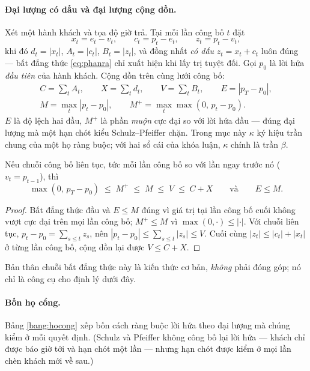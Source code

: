 \paragraph{Đại lượng có dấu và đại lượng cộng dồn.} Xét một hành khách và tọa độ giờ trả. Tại mỗi
lần công bố $t$ đặt
\begin{equation}
x_t = e_t - v_t, \qquad c_t = p_t - e_t, \qquad z_t = p_t - v_t,
\end{equation}
khi đó $d_t = |x_t|$, $A_t = |c_t|$, $B_t = |z_t|$, và đồng nhất \emph{có dấu} $z_t = x_t + c_t$
luôn đúng --- bất đẳng thức \eqref{eq:phanra} chỉ xuất hiện khi lấy trị tuyệt đối. Gọi $p_0$ là
lời hứa \emph{đầu tiên} của hành khách. Cộng dồn trên cùng lưới công bố:
\begin{gather}
C = \sum_t A_t, \qquad X = \sum_t d_t, \qquad V = \sum_t B_t, \qquad E = |p_T - p_0|,\\
M = \max_t |p_t - p_0|, \qquad M^{+} = \max_t \max(0,\, p_t - p_0).
\end{gather}
$E$ là độ lệch hai đầu, $M^{+}$ là phần \emph{muộn} cực đại so với lời hứa đầu --- đúng đại lượng mà
một hạn chót kiểu Schulz--Pfeiffer chặn. Trong mục này $\kappa$ ký hiệu trần chung của một họ ràng
buộc; với hai sổ cái của khóa luận, $\kappa$ chính là trần $\beta$.

\begin{menhde}
\label{md:chuoi}
Nếu chuỗi công bố liên tục, tức mỗi lần công bố so với lần ngay trước nó ($v_t = p_{t-1}$), thì
\[
\max(0,\, p_T - p_0) \;\le\; M^{+} \;\le\; M \;\le\; V \;\le\; C + X
\qquad\text{và}\qquad E \le M .
\]
\end{menhde}

\begin{proof}
Bất đẳng thức đầu và $E \le M$ đúng vì giá trị tại lần công bố cuối không vượt cực đại trên mọi
lần công bố; $M^{+} \le M$ vì $\max(0,\cdot) \le |\cdot|$. Với chuỗi liên tục,
$p_t - p_0 = \sum_{s \le t} z_s$, nên $|p_t - p_0| \le \sum_{s \le t} |z_s| \le V$. Cuối cùng
$|z_t| \le |c_t| + |x_t|$ ở từng lần công bố, cộng dồn lại được $V \le C + X$.
\end{proof}

Bản thân chuỗi bất đẳng thức này là kiến thức cơ bản, \emph{không} phải đóng góp; nó chỉ là công
cụ cho định lý dưới đây.

\paragraph{Bốn họ cổng.} Bảng \ref{bang:hocong} xếp bốn cách ràng buộc lời hứa theo đại lượng mà
chúng kiểm ở mỗi quyết định. (Schulz và Pfeiffer không công bố lại lời hứa --- khách chỉ được báo
giờ tới và hạn chót một lần --- nhưng hạn chót được kiểm ở mọi lần chèn khách mới về sau.)

